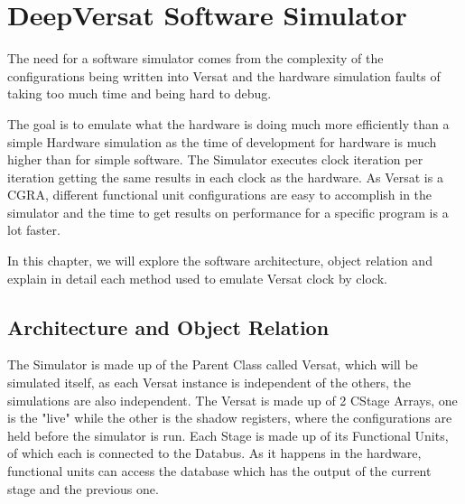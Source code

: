 \chapter{DeepVersat Software Simulator}
\label{chapter:Simulator}

The need for a software simulator comes from the complexity of the configurations 
being written into Versat and the hardware simulation faults of taking too much time and being hard to debug.

The goal is to emulate what the hardware is doing much more efficiently than 
a simple Hardware simulation as the time of development for hardware
is much higher than for simple software. The Simulator executes clock iteration per iteration 
getting the same results in each clock as the hardware. 
As Versat is a CGRA, different functional unit configurations are easy to accomplish 
in the simulator and the time to get results on performance
for a specific program is a lot faster. 

In this chapter, we will explore the software architecture, 
object relation and explain in detail each method used to emulate Versat clock by clock.




\section{Architecture and Object Relation}

The Simulator is made up of the Parent Class called Versat, which will be simulated itself, 
as each Versat instance is independent of the others, the simulations are also independent.
The Versat is made up of 2 CStage Arrays, one is the "live" while the other is the 
shadow registers, where the configurations are held before the simulator is run.
Each Stage is made up of its Functional Units, of which each is connected to the Databus.
As it happens in the hardware, functional units can access the database which has the output 
of the current stage and the previous one.
\clearpage

